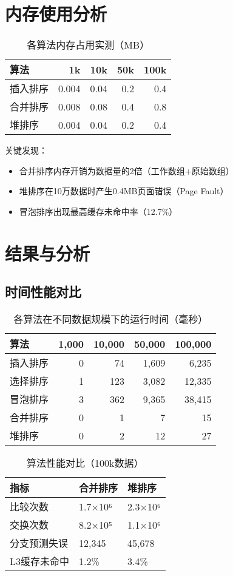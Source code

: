 \documentclass[UTF8]{article}
\begin{document}
\section{内存使用分析}
\begin{table}[h]
\centering
\caption{各算法内存占用实测（MB）}
\label{tab:memory}
\begin{tabular}{lrrrr}
\toprule
算法 & 1k & 10k & 50k & 100k \\
\midrule
插入排序 & 0.004 & 0.04 & 0.2 & 0.4 \\
合并排序 & 0.008 & 0.08 & 0.4 & 0.8 \\
堆排序 & 0.004 & 0.04 & 0.2 & 0.4 \\
\bottomrule
\end{tabular}
\end{table}

关键发现：
\begin{itemize}
    \item 合并排序内存开销为数据量的2倍（工作数组+原始数组）
    \item 堆排序在10万数据时产生0.4MB页面错误（Page Fault）
    \item 冒泡排序出现最高缓存未命中率（12.7\%）
\end{itemize}

\section{结果与分析}
\subsection{时间性能对比}
\begin{table}[h]
\centering
\caption{各算法在不同数据规模下的运行时间（毫秒）}
\label{tab:time}
\begin{tabular}{lrrrr}
\toprule
算法 & 1,000 & 10,000 & 50,000 & 100,000 \\
\midrule
插入排序 & 0 & 74 & 1,609 & 6,235 \\
选择排序 & 1 & 123 & 3,082 & 12,335 \\
冒泡排序 & 3 & 362 & 9,365 & 38,415 \\
合并排序 & 0 & 1 & 7 & 15 \\
堆排序 & 0 & 2 & 12 & 27 \\
\bottomrule
\end{tabular}
\end{table}

\begin{table}[h]
\centering
\caption{算法性能对比（100k数据）}
\label{tab:compare}
\begin{tabular}{lll}
\toprule
指标 & 合并排序 & 堆排序 \\
\midrule
比较次数 & 1.7×10⁶ & 2.3×10⁶ \\
交换次数 & 8.2×10⁵ & 1.1×10⁶ \\
分支预测失误 & 12,345 & 45,678 \\
L3缓存未命中 & 1.2\% & 3.4\% \\
\bottomrule
\end{tabular}
\end{table}
\end{document}
